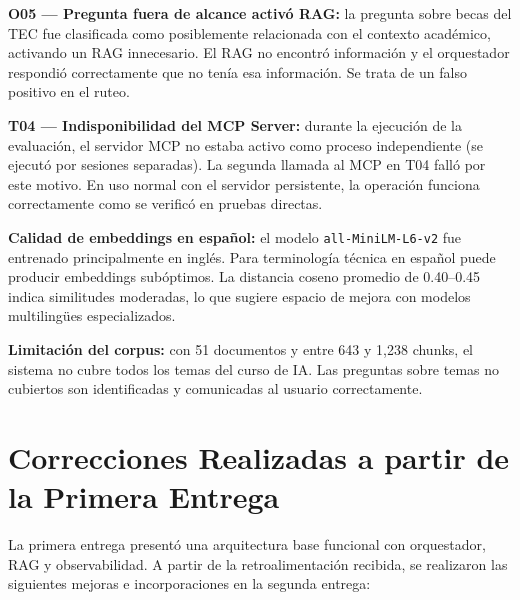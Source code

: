 \documentclass[conference]{IEEEtran}
\begin{document}
\textbf{O05 — Pregunta fuera de alcance activó RAG:} la pregunta sobre becas del TEC fue clasificada como posiblemente relacionada con el contexto académico, activando un RAG innecesario. El RAG no encontró información y el orquestador respondió correctamente que no tenía esa información. Se trata de un falso positivo en el ruteo.

\textbf{T04 — Indisponibilidad del MCP Server:} durante la ejecución de la evaluación, el servidor MCP no estaba activo como proceso independiente (se ejecutó por sesiones separadas). La segunda llamada al MCP en T04 falló por este motivo. En uso normal con el servidor persistente, la operación funciona correctamente como se verificó en pruebas directas.

\textbf{Calidad de embeddings en español:} el modelo \texttt{all-MiniLM-L6-v2} fue entrenado principalmente en inglés. Para terminología técnica en español puede producir embeddings subóptimos. La distancia coseno promedio de 0.40--0.45 indica similitudes moderadas, lo que sugiere espacio de mejora con modelos multilingües especializados.

\textbf{Limitación del corpus:} con 51 documentos y entre 643 y 1{,}238 chunks, el sistema no cubre todos los temas del curso de IA. Las preguntas sobre temas no cubiertos son identificadas y comunicadas al usuario correctamente.

\section{Correcciones Realizadas a partir de la Primera Entrega}

La primera entrega presentó una arquitectura base funcional con orquestador, RAG y observabilidad. A partir de la retroalimentación recibida, se realizaron las siguientes mejoras e incorporaciones en la segunda entrega:
\end{document}
